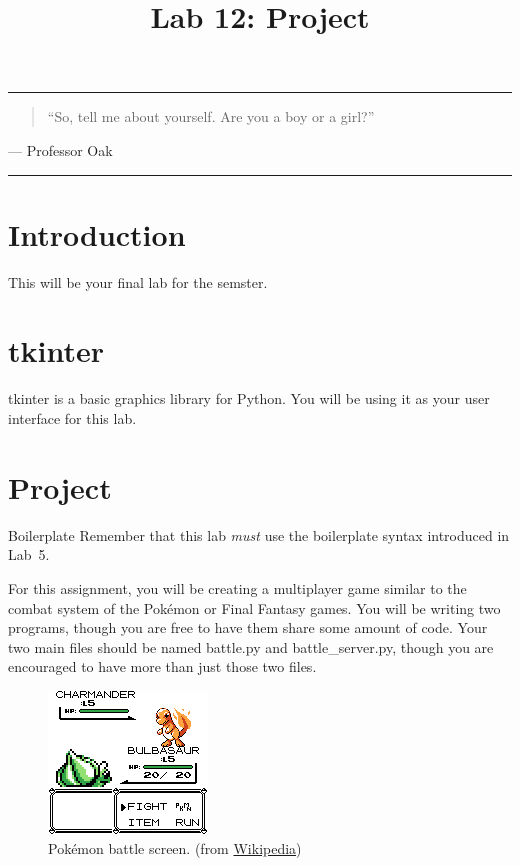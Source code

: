 \documentclass[11pt]{cselabheader}
\title{Lab 12: Project}
\begin{document}
\maketitle

\hrule
\begin{quotation}
``So, tell me about yourself. Are you a boy or a girl?''
\end{quotation}
\begin{flushright}
--- Professor Oak
\end{flushright}

\hrule

\section{Introduction}
This will be your final lab for the semster.

\pagebreak

\section{tkinter}
\label{sec:tk}
tkinter is a basic graphics library for Python. You will be using it as your
user interface for this lab.

\pagebreak

\section{Project}
\label{sec:proj}

\begin{warningbox}{Boilerplate}
  Remember that this lab \emph{must} use the
  boilerplate syntax introduced in Lab~5.
\end{warningbox}

For this assignment, you will be creating a multiplayer game similar to the
combat system of the Pok\'emon or Final Fantasy games. You will be writing
two programs, though you are free to have them share some amount of code.
Your two main files should be named battle.py and battle\_server.py, though
you are encouraged to have more than just those two files.

\begin{figure}[h]
  \centering
  \includegraphics{img/Bulbasaur_pokemon_red}
  \caption{Pok\'emon battle screen. (from
    \href{http://en.wikipedia.org/wiki/File:Bulbasaur_pokemon_red.png}{Wikipedia})}
  \label{poke}
\end{figure}
\end{document}
